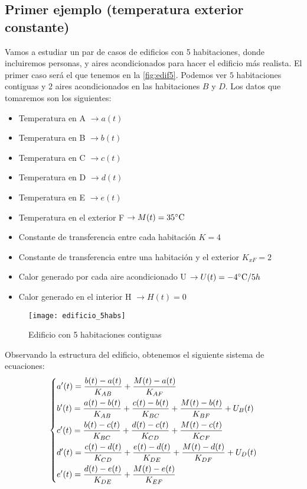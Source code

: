 \subsection{Primer ejemplo (temperatura exterior constante)}
Vamos a estudiar un par de casos de edificios con 5 habitaciones, donde incluiremos personas, y aires acondicionados para hacer el edificio más realista. El primer caso será el que tenemos en la \autoref{fig:edif5}. Podemos ver $5$ habitaciones contiguas y $2$ aires acondicionados en las habitaciones $B$ y $D$. Los datos que tomaremos son los siguientes:
\begin{itemize}
	\item Temperatura en A $\rightarrow a(t)  $ 
	\item Temperatura en B $\rightarrow b(t)  $ 
	\item Temperatura en C $\rightarrow c(t)  $ 
	\item Temperatura en D $\rightarrow d(t)  $ 
	\item Temperatura en E $\rightarrow e(t)  $ 
	\item Temperatura en el exterior F $\rightarrow M(t) = 35 \celsius$ 
	\item Constante de transferencia entre cada habitación $K = 4$
	\item Constante de transferencia entre una habitación y el exterior $K_{xF} = 2$
	\item Calor generado por cada aire acondicionado U $\rightarrow U(t) = -4\celsius / 5h$
	\item Calor generado en el interior H $\rightarrow H(t) = 0$
\end{itemize}
\begin{figure}[h!]
	\centering
	\texttt{[image: edificio\_5habs]}
	\caption{Edificio con 5 habitaciones contiguas}
	\label{fig:edif5}
\end{figure}
Observando la estructura del edificio, obtenemos el siguiente sistema de ecuaciones:
\begin{equation}\begin{dcases}
	 a'(t)= \dfrac{b(t)-a(t)}{K_{AB}} + \dfrac{M(t) - a(t)}{K_{AF}} \\  b'(t)= \dfrac{a(t)-b(t)}{K_{AB}} + \dfrac{c(t)-b(t)}{K_{BC}} + \dfrac{M(t) - b(t)}{K_{BF}} + U_B(t) \\ c'(t)= \dfrac{b(t)-c(t)}{K_{BC}} + \dfrac{d(t)-c(t)}{K_{CD}} + \dfrac{M(t) - c(t)}{K_{CF}} \\  d'(t)= \dfrac{c(t)-d(t)}{K_{CD}} + \dfrac{e(t)-d(t)}{K_{DE}} + \dfrac{M(t) - d(t)}{K_{DF}} + U_D(t) \\  e'(t)= \dfrac{d(t)-e(t)}{K_{DE}} + \dfrac{M(t) - e(t)}{K_{EF}} \end{dcases}
\end{equation}
